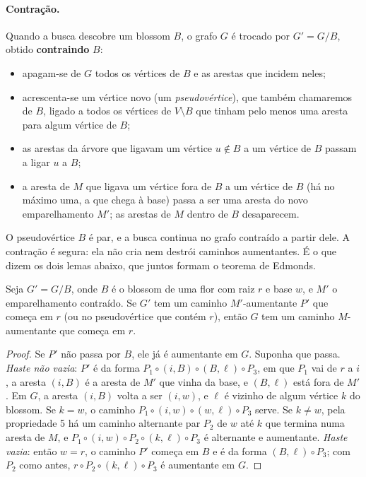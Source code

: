 \paragraph{Contração.} Quando a busca descobre um blossom $B$, o grafo $G$ é trocado por $G'=G/B$, obtido \textbf{contraindo} $B$:
\begin{itemize}
  \item apagam-se de $G$ todos os vértices de $B$ e as arestas que incidem neles;
  \item acrescenta-se um vértice novo (um \emph{pseudovértice}), que também chamaremos de $B$, ligado a todos os vértices de $V\setminus B$ que tinham pelo menos uma aresta para algum vértice de $B$;
  \item as arestas da árvore que ligavam um vértice $u\notin B$ a um vértice de $B$ passam a ligar $u$ a $B$;
  \item a aresta de $M$ que ligava um vértice fora de $B$ a um vértice de $B$ (há no máximo uma, a que chega à base) passa a ser uma aresta do novo emparelhamento $M'$; as arestas de $M$ dentro de $B$ desaparecem.
\end{itemize}
O pseudovértice $B$ é par, e a busca continua no grafo contraído a partir dele. A contração é segura: ela não cria nem destrói caminhos aumentantes. É o que dizem os dois lemas abaixo, que juntos formam o teorema de Edmonds.

\begin{lema}\label{lema:expande}
Seja $G'=G/B$, onde $B$ é o blossom de uma flor com raiz $r$ e base $w$, e $M'$ o emparelhamento contraído. Se $G'$ tem um caminho $M'$-aumentante $P'$ que começa em $r$ (ou no pseudovértice que contém $r$), então $G$ tem um caminho $M$-aumentante que começa em $r$.
\end{lema}
\begin{proof}
Se $P'$ não passa por $B$, ele já é aumentante em $G$. Suponha que passa. \emph{Haste não vazia}: $P'$ é da forma $P_1\circ(i,B)\circ(B,\ell)\circ P_3$, em que $P_1$ vai de $r$ a $i$, a aresta $(i,B)$ é a aresta de $M'$ que vinha da base, e $(B,\ell)$ está fora de $M'$. Em $G$, a aresta $(i,B)$ volta a ser $(i,w)$, e $\ell$ é vizinho de algum vértice $k$ do blossom. Se $k=w$, o caminho $P_1\circ(i,w)\circ(w,\ell)\circ P_3$ serve. Se $k\ne w$, pela propriedade 5 há um caminho alternante par $P_2$ de $w$ até $k$ que termina numa aresta de $M$, e $P_1\circ(i,w)\circ P_2\circ(k,\ell)\circ P_3$ é alternante e aumentante. \emph{Haste vazia}: então $w=r$, o caminho $P'$ começa em $B$ e é da forma $(B,\ell)\circ P_3$; com $P_2$ como antes, $r\circ P_2\circ(k,\ell)\circ P_3$ é aumentante em $G$.
\end{proof}


